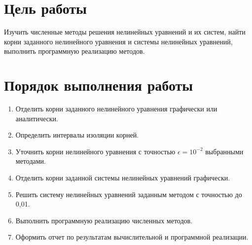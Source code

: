\documentclass[a4paper,12pt]{article}
\begin{document}
\setcounter{page}{2}

\newpage

\tableofcontents

\newpage

\section{Цель работы}
Изучить численные методы решения нелинейных уравнений и их систем, найти корни заданного нелинейного уравнения и системы нелинейных уравнений, выполнить программную реализацию методов.

\section{Порядок выполнения работы}
\begin{enumerate}
    \item Отделить корни заданного нелинейного уравнения графически или аналитически.
    \item Определить интервалы изоляции корней.
    \item Уточнить корни нелинейного уравнения с точностью $\epsilon=10^{-2}$ выбранными методами.
    \item Отделить корни заданной системы нелинейных уравнений графически.
    \item Решить систему нелинейных уравнений заданным методом с точностью до 0,01.
    \item Выполнить программную реализацию численных методов.
    \item Оформить отчет по результатам вычислительной и программной реализации.
\end{enumerate}

\end{document}

